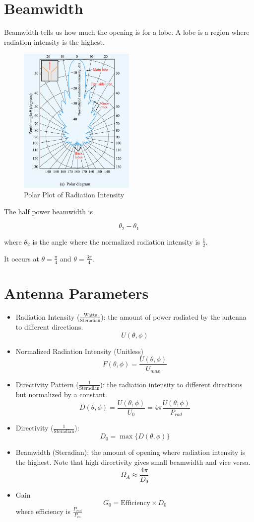 \documentclass{article} %
\begin{document}
\section{Beamwidth}

Beamwidth tells us how much the opening is for a lobe. A lobe is a region where radiation intensity is the highest.

\begin{figure}[H]
    \centering
    \includegraphics[width=0.5\textwidth]{./image/figure3.png}
    \caption{Polar Plot of Radiation Intensity}
\end{figure}

The half power beamwidth is

\[\theta_2 - \theta_1\]

where $\theta_2$ is the angle where the normalized radiation intensity is $\frac{1}{2}$.

It occurs at $\theta = \frac{\pi}{4}$ and $\theta = \frac{3\pi}{4}$.


\section{Antenna Parameters}
\begin{itemize}
    \item Radiation Intensity ($\frac{\text{Watts}}{\text{Steradian}}$): the amount of power radiated by the antenna to different directions.
          \[U(\theta, \phi)\]
    \item Normalized Radiation Intensity (Unitless)
          \[F(\theta, \phi) = \frac{U(\theta, \phi)}{U_{max}}\]
    \item Directivity Pattern ($\frac{1}{\text{Steradian}}$): the radiation intensity to different directions but normalized by a constant.
          \[D(\theta, \phi) = \frac{U(\theta, \phi)}{U_0} = 4 \pi \frac{U(\theta, \phi)}{P_{rad}}\]
    \item Directivity ($\frac{1}{\text{Steradian}}$):
          \[D_0 = \max\{D(\theta, \phi)\}\]
    \item Beamwidth (Steradian): the amount of opening where radiation intensity is the highest. Note that high directivity gives small beamwidth and vice versa.
          \[\Omega_A \approx \frac{4\pi}{D_0} \]
    \item Gain
          \[G_0 = \text{Efficiency} \times D_0\]
          where efficiency is $\frac{P_{rad}}{P_{in}}$
\end{itemize}
\end{document}
